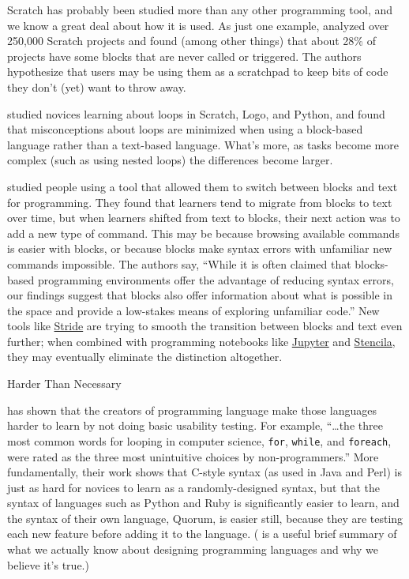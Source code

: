 Scratch has probably been studied more than any other programming
tool, and we know a great deal about how it is used.  As just one
example, \cite{Aiva2016} analyzed over 250,000 Scratch projects and
found (among other things) that about 28\% of projects have some blocks
that are never called or triggered.  The authors hypothesize that
users may be using them as a scratchpad to keep bits of code they
don't (yet) want to throw away.

\cite{Grov2017,Mlad2017} studied novices learning about loops in
Scratch, Logo, and Python, and found that misconceptions about loops
are minimized when using a block-based language rather than a
text-based language.  What's more, as tasks become more complex (such
as using nested loops) the differences become larger.

\cite{Wein2017a} studied people using a tool that allowed them to
switch between blocks and text for programming.  They found that
learners tend to migrate from blocks to text over time, but when
learners shifted from text to blocks, their next action was to add a
new type of command.  This may be because browsing available commands
is easier with blocks, or because blocks make syntax errors with
unfamiliar new commands impossible.  The authors say, ``While it is
often claimed that blocks-based programming environments offer the
advantage of reducing syntax errors, our findings suggest that blocks
also offer information about what is possible in the space and provide
a low-stakes means of exploring unfamiliar code.''  New tools like
\href{https://www.greenfoot.org/frames/}{Stride} are trying to smooth
the transition between blocks and text even further; when combined
with programming notebooks like \href{http://jupyter.org/}{Jupyter}
and \href{http://stenci.la/}{Stencila}, they may eventually eliminate
the distinction altogether.

\begin{callout}{Harder Than Necessary}

  \cite{Stef2013} has shown that the creators of programming language
  make those languages harder to learn by not doing basic usability
  testing.  For example, ``{\ldots}the three most common words for
  looping in computer science, \texttt{for}, \texttt{while}, and
  \texttt{foreach}, were rated as the three most unintuitive choices
  by non-programmers.''  More fundamentally, their work shows that
  C-style syntax (as used in Java and Perl) is just as hard for
  novices to learn as a randomly-designed syntax, but that the syntax
  of languages such as Python and Ruby is significantly easier to
  learn, and the syntax of their own language, Quorum, is easier
  still, because they are testing each new feature before adding it to
  the language. (\cite{Stef2017} is a useful brief summary of what we
  actually know about designing programming languages and why we
  believe it's true.)

\end{callout}
  
